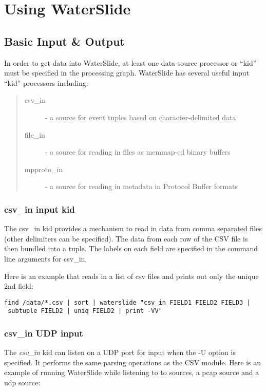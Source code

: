 \documentclass[11pt]{article}
\begin{document}
\section {Using WaterSlide}
\subsection {Basic Input \& Output}
In order to get data into WaterSlide, at least one data source processor 
or ``kid'' must be specified in the processing graph.  WaterSlide has 
several useful input ``kid'' processors including:

\begin{quote}
\begin{description}
\item [csv\_in] - a source for event tuples based on character-delimited data
\item [file\_in] - a source for reading in files as memmap-ed binary buffers
\item [mpproto\_in] - a source for reading in metadata in Protocol Buffer formats
\end{description}
\end{quote}

\subsubsection{csv\_in input kid}
The csv\_in kid provides a mechanism to read in data from comma separated files
(other delimiters can be specified).  The data from each row of the CSV file is then bundled into a tuple.  The labels on each
field are specified in the command line arguments for csv\_in.

Here is an example that reads in a list of csv files and prints out only the unique 2nd field: 

\begin{lstlisting}
find /data/*.csv | sort | waterslide "csv_in FIELD1 FIELD2 FIELD3 |
 subtuple FIELD2 | uniq FIELD2 | print -VV"
\end{lstlisting}

\subsubsection{csv\_in UDP input}
The \emph{csv\_in} kid can listen on a UDP port for input when the -U option is specified. 
It performs the same parsing operations
as the CSV module.  Here is an example of running WaterSlide while listening to to sources, a pcap
source and a udp source:
\end{document}
